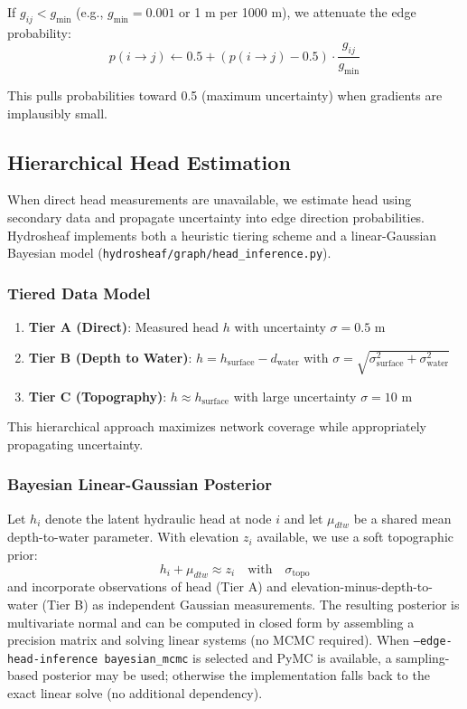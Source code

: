 \documentclass[12pt,a4paper]{article}
\theoremstyle{plain}
\theoremstyle{definition}
\theoremstyle{remark}
\begin{document}
If $g_{ij} < g_{\min}$ (e.g., $g_{\min} = 0.001$ or 1 m per 1000 m), we attenuate the edge probability:
\begin{equation}\label{eq:gradient_guard}
	p(i \to j) \leftarrow 0.5 + (p(i \to j) - 0.5) \cdot \frac{g_{ij}}{g_{\min}}
\end{equation}

This pulls probabilities toward 0.5 (maximum uncertainty) when gradients are implausibly small.

\subsection{Hierarchical Head Estimation}

When direct head measurements are unavailable, we estimate head using secondary data and propagate uncertainty into edge direction probabilities. Hydrosheaf implements both a heuristic tiering scheme and a linear-Gaussian Bayesian model (\texttt{hydrosheaf/graph/head\_inference.py}).

\subsubsection{Tiered Data Model}

\begin{enumerate}
	\item \textbf{Tier A (Direct)}: Measured head $h$ with uncertainty $\sigma = 0.5$ m
	\item \textbf{Tier B (Depth to Water)}: $h = h_{\text{surface}} - d_{\text{water}}$ with $\sigma = \sqrt{\sigma_{\text{surface}}^2 + \sigma_{\text{water}}^2}$
	\item \textbf{Tier C (Topography)}: $h \approx h_{\text{surface}}$ with large uncertainty $\sigma = 10$ m
\end{enumerate}

This hierarchical approach maximizes network coverage while appropriately propagating uncertainty.

\subsubsection{Bayesian Linear-Gaussian Posterior}

Let $h_i$ denote the latent hydraulic head at node $i$ and let $\mu_{dtw}$ be a shared mean depth-to-water parameter. With elevation $z_i$ available, we use a soft topographic prior:
\begin{equation}
	h_i + \mu_{dtw} \approx z_i \quad \text{with} \quad \sigma_{\text{topo}}
\end{equation}
and incorporate observations of head (Tier A) and elevation-minus-depth-to-water (Tier B) as independent Gaussian measurements. The resulting posterior is multivariate normal and can be computed in closed form by assembling a precision matrix and solving linear systems (no MCMC required). When \texttt{--edge-head-inference bayesian\_mcmc} is selected and PyMC is available, a sampling-based posterior may be used; otherwise the implementation falls back to the exact linear solve (no additional dependency).
\end{document}
